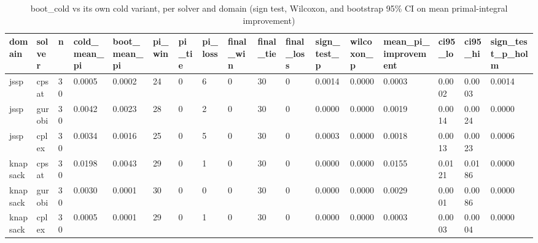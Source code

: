 \begin{table}[t]
\centering
\begin{tabular}{lllllllllllllllll}
\toprule
domain & solver & n & cold\_mean\_pi & boot\_mean\_pi & pi\_win & pi\_tie & pi\_loss & final\_win & final\_tie & final\_loss & sign\_test\_p & wilcoxon\_p & mean\_pi\_improvement & ci95\_lo & ci95\_hi & sign\_test\_p\_holm \\
\midrule
jssp & cpsat & 30 & 0.0005 & 0.0002 & 24 & 0 & 6 & 0 & 30 & 0 & 0.0014 & 0.0000 & 0.0003 & 0.0002 & 0.0003 & 0.0014 \\
jssp & gurobi & 30 & 0.0042 & 0.0023 & 28 & 0 & 2 & 0 & 30 & 0 & 0.0000 & 0.0000 & 0.0019 & 0.0014 & 0.0024 & 0.0000 \\
jssp & cplex & 30 & 0.0034 & 0.0016 & 25 & 0 & 5 & 0 & 30 & 0 & 0.0003 & 0.0000 & 0.0018 & 0.0013 & 0.0023 & 0.0006 \\
knapsack & cpsat & 30 & 0.0198 & 0.0043 & 29 & 0 & 1 & 0 & 30 & 0 & 0.0000 & 0.0000 & 0.0155 & 0.0121 & 0.0186 & 0.0000 \\
knapsack & gurobi & 30 & 0.0030 & 0.0001 & 30 & 0 & 0 & 0 & 30 & 0 & 0.0000 & 0.0000 & 0.0029 & 0.0001 & 0.0086 & 0.0000 \\
knapsack & cplex & 30 & 0.0005 & 0.0001 & 29 & 0 & 1 & 0 & 30 & 0 & 0.0000 & 0.0000 & 0.0003 & 0.0003 & 0.0004 & 0.0000 \\
\bottomrule
\end{tabular}
\caption{boot\_cold vs its own cold variant, per solver and domain (sign test, Wilcoxon, and bootstrap 95\% CI on mean primal-integral improvement)}
\label{tab:multisolver-pairwise}
\end{table}
